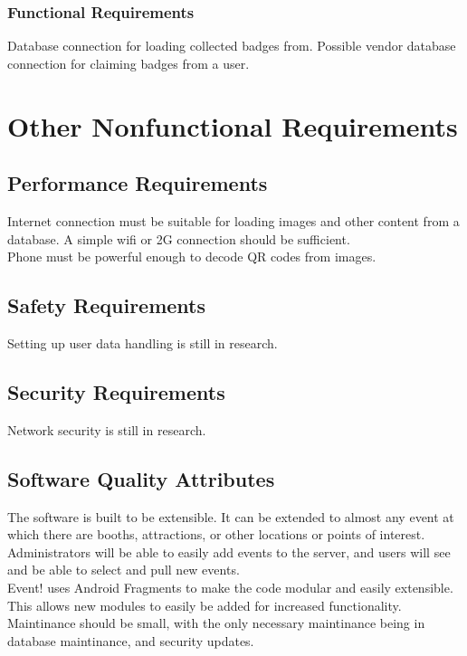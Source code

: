 \documentclass{scrreprt}
\begin{document}
\subsection{Functional Requirements}
Database connection for loading collected badges from. Possible vendor database connection 
for claiming badges from a user.


\chapter{Other Nonfunctional Requirements}

\section{Performance Requirements}
Internet connection must be suitable for loading images and other content from a 
database. A simple wifi or 2G connection should be sufficient. \\
Phone must be powerful enough to decode QR codes from images.

\section{Safety Requirements}
Setting up user data handling is still in research.

\section{Security Requirements}
Network security is still in research.

\section{Software Quality Attributes}
The software is built to be extensible. It can be extended to almost any event at
which there are booths, attractions, or other locations or points of interest. \\ 
Administrators will be able to easily add events to the server, and users will see
and be able to select and pull new events. \\
Event! uses Android Fragments to make the code modular and easily extensible. 
This allows new modules to easily be added for increased functionality. \\
Maintinance should be small, with the only necessary maintinance being in 
database maintinance, and security updates. \\
\end{document}
